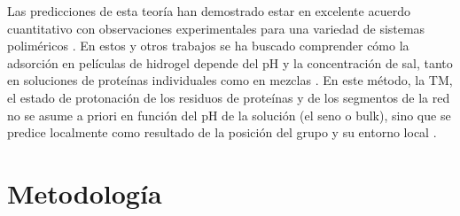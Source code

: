 Las predicciones de esta teor\'ia han demostrado estar en excelente acuerdo cuantitativo con observaciones experimentales para una variedad de sistemas polim\'ericos \cite{tagliazucchi2010responsive,wu2007behavior}. En estos y otros trabajos se ha buscado comprender c\'omo la adsorci\'on en  pel\'iculas de hidrogel depende del pH y la concentraci\'on de sal, tanto en soluciones de prote\'inas individuales como en mezclas \cite{hagemann2018use,tagliazucchi2010responsive,longo2016adsorption}. En este m\'etodo, la TM, el estado de protonaci\'on de los residuos de prote\'inas y de los segmentos de la red no se asume a priori en funci\'on del pH de la soluci\'on (el seno o bulk), sino que se predice localmente como resultado de la posici\'on del grupo y su entorno local \cite{longo2019protonation,tagliazucchi2010responsive}.\\


\section{Metodolog\'ia}

